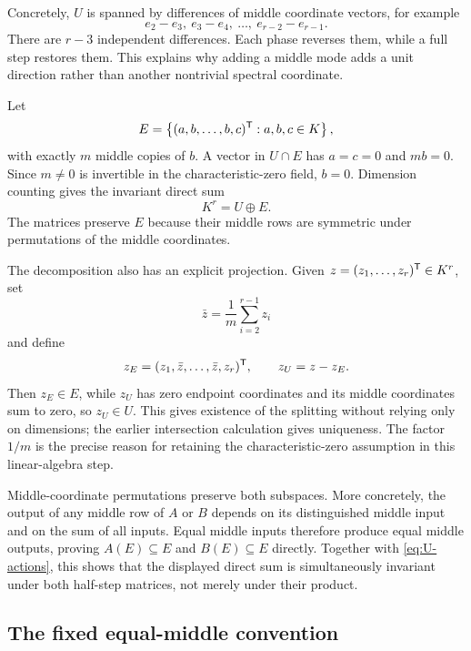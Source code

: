 \documentclass[11pt]{article}
\theoremstyle{remark}
\numberwithin{equation}{section}
\begin{document}
Concretely, \(U\) is spanned by differences of middle coordinate vectors,
for example
\[
e_2-e_3,\ e_3-e_4,\ \ldots,\ e_{r-2}-e_{r-1}.
\]
There are \(r-3\) independent differences.  Each phase reverses them, while
a full step restores them.  This explains why adding a middle mode adds a
unit direction rather than another nontrivial spectral coordinate.

Let
\begin{equation}\label{eq:E-def}
E=\left\{(a,b,\ldots,b,c)^{\mathsf{T}}:a,b,c\in K\right\},
\end{equation}
with exactly \(m\) middle copies of \(b\).  A vector in \(U\cap E\) has
\(a=c=0\) and \(mb=0\).  Since \(m\neq0\) is invertible in the
characteristic-zero field, \(b=0\).  Dimension counting gives the invariant
direct sum
\begin{equation}\label{eq:direct-sum}
K^r=U\oplus E.
\end{equation}
The matrices preserve \(E\) because their middle rows are symmetric under
permutations of the middle coordinates.

The decomposition also has an explicit projection.  Given
\(z=(z_1,\ldots,z_r)^{\mathsf{T}}\in K^r\), set
\[
\bar z=\frac1m\sum_{i=2}^{r-1}z_i
\]
and define
\[
z_E=(z_1,\bar z,\ldots,\bar z,z_r)^{\mathsf{T}},
\qquad
z_U=z-z_E.
\]
Then \(z_E\in E\), while \(z_U\) has zero endpoint coordinates and its
middle coordinates sum to zero, so \(z_U\in U\).  This gives existence of
the splitting without relying only on dimensions; the earlier intersection
calculation gives uniqueness.  The factor \(1/m\) is the precise reason for
retaining the characteristic-zero assumption in this linear-algebra step.

Middle-coordinate permutations preserve both subspaces.  More concretely,
the output of any middle row of \(A\) or \(B\) depends on its distinguished
middle input and on the sum of all inputs.  Equal middle inputs therefore
produce equal middle outputs, proving \(A(E)\subseteq E\) and
\(B(E)\subseteq E\) directly.  Together with \eqref{eq:U-actions}, this
shows that the displayed direct sum is simultaneously invariant under both
half-step matrices, not merely under their product.

\subsection{The fixed equal-middle convention}
\end{document}
